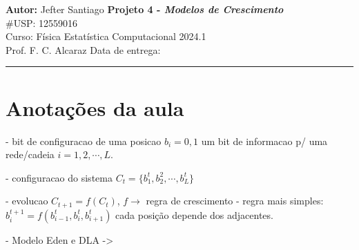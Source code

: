 \documentclass[a4paper, 11pt]{article}
\begin{document}
\noindent
\large\textbf{Autor:} Jefter Santiago \hfill \textbf{Projeto 4 - {\color{blue}\emph{Modelos de Crescimento}}}   \\
\#USP: 12559016 \\
\normalsize Curso: Física Estatística Computacional \hfill 2024.1 \\
Prof. F. C. Alcaraz \hfill Data de entrega: \\
\noindent\rule{7in}{2.8pt}


\section*{Anotações da aula}

- bit de configuracao de uma posicao \( b_i = 0, 1 \) um bit de informacao p/ uma rede/cadeia
\( i = 1, 2, \cdots , L \). 

- configuracao do sistema \( C_t = \{ b_1^t, b_2^2, \cdots , b_L^t\} \) 

- evolucao \( C_{t+1} = f(C_t) \), \( f \rightarrow \) regra de crescimento 
- regra mais simples: \( b_i^{t + 1} = f(b_{i-1}^t, b_i^t, b_{i+1}^t)\) cada posição
depende dos adjacentes.

- Modelo Eden e DLA -> 
\end{document}
